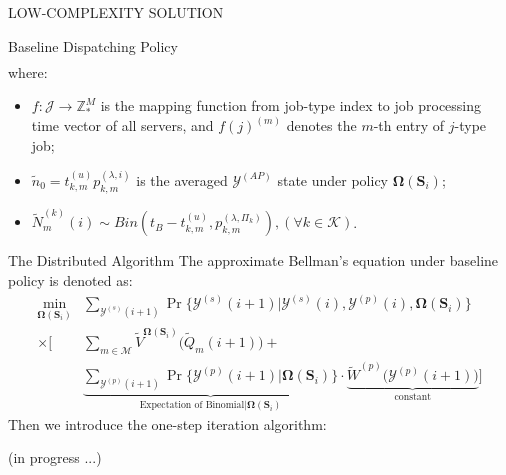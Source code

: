 \documentclass[10pt, conference, letterpaper]{IEEEtran}
\newcommand{\domZ}{\mathbb{Z}_{*}}
\renewcommand{\vec}{\mathbf}
\newcommand{\apSet}{\mathcal{K}}
\newcommand{\esSet}{\mathcal{M}}
\newcommand{\jSpace}{\mathcal{J}}
\newcommand{\Stat}{\mathbf{S}}
\newcommand{\Obsv}{\mathcal{Y}}
\newcommand{\Policy}{\mathbf{\Omega}}
\begin{document}
\begin{section}{LOW-COMPLEXITY SOLUTION}
\begin{subsection}{Baseline Dispatching Policy}
\begin{align}
            \end{align}
            where:
            \begin{itemize}
                \item $f:\jSpace \to \domZ^M$ is the mapping function from job-type index to job processing time vector of all servers, and $f(j)^{(m)}$ denotes the $m$-th entry of $j$-type job;
                \item $\tilde{n}_0 = t^{(u)}_{k,m}p^{(\lambda,i)}_{k,m}$ is the averaged $\Obsv^{(AP)}$ state under policy $\Policy(\Stat_i)$;
                \item $\tilde{N}^{(k)}_m(i) \sim Bin(t_B-t^{(u)}_{k,m}, p^{(\lambda, \Pi_k)}_{k,m}), (\forall k\in\apSet)$.
            \end{itemize}
        \end{subsection}

        \begin{subsection}{The Distributed Algorithm}
            The approximate Bellman's equation under baseline policy is denoted as:
            \begin{align}
                \min_{\Policy(\Stat_i)}& \sum_{\Obsv^{(s)}(i+1)} \Pr\{\Obsv^{(s)}(i+1)|\Obsv^{(s)}(i), \Obsv^{(p)}(i), \Policy(\Stat_i)\}
                \nonumber\\
                \times \bigg[& \sum_{m\in\esSet} \tilde{V}^{\Policy(\Stat_i)}\bigg(\tilde{Q}_m(i+1)\bigg) +
                    \nonumber\\
                    & \underbrace{\sum_{\Obsv^{(p)}(i+1)} \Pr\{\Obsv^{(p)}(i+1)|\Policy(\Stat_i)\}}_{\text{Expectation of Binomial}|\Policy(\Stat_i)}
                    \cdot \underbrace{\tilde{W}^{(p)}\bigg(\Obsv^{(p)}(i+1)\bigg)}_{\text{constant}} \bigg]
            \end{align}
            Then we introduce the one-step iteration algorithm:
            \begin{algorithm}[H]
                \caption{Distributed Algorithm for $k$-th AP}
                \begin{algorithmic}
                    \WHILE{\TRUE}
                        \STATE (in progress ...)
                    \ENDWHILE
                \end{algorithmic}
            \end{algorithm}
        \end{subsection}
        
    \end{section}
\end{document}
